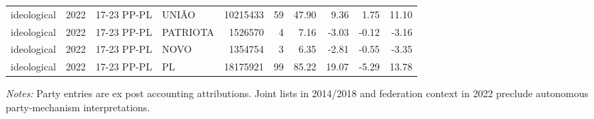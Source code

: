 \begin{landscape}
\begin{longtable}{lllL{2.8cm}rrrrrr}
ideological & 2022 & 17-23 PP-PL & UNIÃO & 10215433 & 59 & 47.90 & 9.36 & 1.75 & 11.10 \\
ideological & 2022 & 17-23 PP-PL & PATRIOTA & 1526570 & 4 & 7.16 & -3.03 & -0.12 & -3.16 \\
ideological & 2022 & 17-23 PP-PL & NOVO & 1354754 & 3 & 6.35 & -2.81 & -0.55 & -3.35 \\
ideological & 2022 & 17-23 PP-PL & PL & 18175921 & 99 & 85.22 & 19.07 & -5.29 & 13.78 \\
\end{longtable}
\noindent\footnotesize\textit{Notes:} Party entries are ex post accounting attributions. Joint lists in 2014/2018 and federation context in 2022 preclude autonomous party-mechanism interpretations.
\endgroup
\end{landscape}
